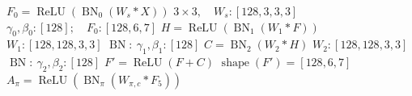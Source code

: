 \documentclass[multi=mathasset,border=0pt]{standalone}
\newenvironment{mathasset}{}{}
\begin{document}
\begin{mathasset}\fontsize{28bp}{33bp}\selectfont\color[HTML]{253044}\(F_0=\operatorname{ReLU}(\operatorname{BN}_0(W_s\ast X))\)\end{mathasset}
\begin{mathasset}\fontsize{23bp}{27bp}\selectfont\color[HTML]{596779}\(3\times3,\quad W_s:[128,3,3,3]\)\end{mathasset}
\begin{mathasset}\fontsize{23bp}{27bp}\selectfont\color[HTML]{596779}\(\gamma_0,\beta_0:[128];\quad F_0:[128,6,7]\)\end{mathasset}
\begin{mathasset}\fontsize{28bp}{33bp}\selectfont\color[HTML]{253044}\(H=\operatorname{ReLU}(\operatorname{BN}_1(W_1\ast F))\)\end{mathasset}
\begin{mathasset}\fontsize{23bp}{27bp}\selectfont\color[HTML]{596779}\(W_1:[128,128,3,3]\)\end{mathasset}
\begin{mathasset}\fontsize{23bp}{27bp}\selectfont\color[HTML]{596779}\(\operatorname{BN}:\ \gamma_1,\beta_1:[128]\)\end{mathasset}
\begin{mathasset}\fontsize{28bp}{33bp}\selectfont\color[HTML]{253044}\(C=\operatorname{BN}_2(W_2\ast H)\)\end{mathasset}
\begin{mathasset}\fontsize{23bp}{27bp}\selectfont\color[HTML]{596779}\(W_2:[128,128,3,3]\)\end{mathasset}
\begin{mathasset}\fontsize{23bp}{27bp}\selectfont\color[HTML]{596779}\(\operatorname{BN}:\ \gamma_2,\beta_2:[128]\)\end{mathasset}
\begin{mathasset}\fontsize{28bp}{33bp}\selectfont\color[HTML]{253044}\(F'=\operatorname{ReLU}(F+C)\)\end{mathasset}
\begin{mathasset}\fontsize{23bp}{27bp}\selectfont\color[HTML]{596779}\(\operatorname{shape}(F')=[128,6,7]\)\end{mathasset}
\begin{mathasset}\fontsize{28bp}{33bp}\selectfont\color[HTML]{253044}\(A_\pi=\operatorname{ReLU}(\operatorname{BN}_\pi(W_{\pi,c}\ast F_5))\)\end{mathasset}
\end{document}
